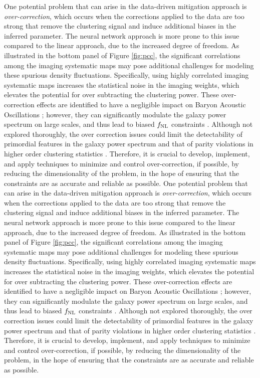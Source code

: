 One potential problem that can arise in the data-driven mitigation approach is \textit{over-correction}, which occurs when the corrections applied to the data are too strong that remove the clustering signal and induce additional biases in the inferred parameter. The neural network approach is more prone to this issue compared to the linear approach, due to the increased degree of freedom. As illustrated in the bottom panel of Figure \ref{fig:pcc}, the significant correlations among the imaging systematic maps may pose additional challenges for modeling these spurious density fluctuations. Specifically, using highly correlated imaging systematic maps increases the statistical noise in the imaging weights, which elevates the potential for over subtracting the clustering power. These over-correction effects are identified to have a negligible impact on Baryon Acoustic Oscillations \citep{merz2021clustering}; however, they can significantly modulate the galaxy power spectrum on large scales, and thus lead to biased $f_{\rm NL}$ constraints \citep{rezaie2021primordial, mueller2022primordial}. Although not explored thoroughly, the over correction issues could limit the detectability of primordial features in the galaxy power spectrum and that of parity violations in higher order clustering statistics \citep{beutler2019primordial, cahn2021test, philcox2022probing}. Therefore, it is crucial to develop, implement, and apply techniques to minimize and control over-correction, if possible, by reducing the dimensionality of the problem, in the hope of ensuring that the constraints are as accurate and reliable as possible. 
One potential problem that can arise in the data-driven mitigation approach is \textit{over-correction}, which occurs when the corrections applied to the data are too strong that remove the clustering signal and induce additional biases in the inferred parameter. The neural network approach is more prone to this issue compared to the linear approach, due to the increased degree of freedom. As illustrated in the bottom panel of Figure \ref{fig:pcc}, the significant correlations among the imaging systematic maps may pose additional challenges for modeling these spurious density fluctuations. Specifically, using highly correlated imaging systematic maps increases the statistical noise in the imaging weights, which elevates the potential for over subtracting the clustering power. These over-correction effects are identified to have a negligible impact on Baryon Acoustic Oscillations \citep{merz2021clustering}; however, they can significantly modulate the galaxy power spectrum on large scales, and thus lead to biased $f_{\rm NL}$ constraints \citep{rezaie2021primordial, mueller2022primordial}. Although not explored thoroughly, the over correction issues could limit the detectability of primordial features in the galaxy power spectrum and that of parity violations in higher order clustering statistics \citep{beutler2019primordial, cahn2021test, philcox2022probing}. Therefore, it is crucial to develop, implement, and apply techniques to minimize and control over-correction, if possible, by reducing the dimensionality of the problem, in the hope of ensuring that the constraints are as accurate and reliable as possible. 

